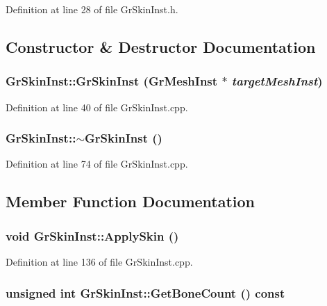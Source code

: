 Definition at line 28 of file GrSkinInst.h.

\subsection{Constructor \& Destructor Documentation}
\hypertarget{class_gr_skin_inst_97aaf25b3f26c18e5ad7032d74e57f40}{
\subsubsection[{GrSkinInst}]{\setlength{\rightskip}{0pt plus 5cm}GrSkinInst::GrSkinInst ({\bf GrMeshInst} $\ast$ {\em targetMeshInst})}}
\label{class_gr_skin_inst_97aaf25b3f26c18e5ad7032d74e57f40}




Definition at line 40 of file GrSkinInst.cpp.\hypertarget{class_gr_skin_inst_a74804ebf0e656cc67c4d4722eaf23ef}{
\subsubsection[{$\sim$GrSkinInst}]{\setlength{\rightskip}{0pt plus 5cm}GrSkinInst::$\sim$GrSkinInst ()}}
\label{class_gr_skin_inst_a74804ebf0e656cc67c4d4722eaf23ef}




Definition at line 74 of file GrSkinInst.cpp.

\subsection{Member Function Documentation}
\hypertarget{class_gr_skin_inst_26a87eb455330a647709378ca51f3d52}{
\subsubsection[{ApplySkin}]{\setlength{\rightskip}{0pt plus 5cm}void GrSkinInst::ApplySkin ()}}
\label{class_gr_skin_inst_26a87eb455330a647709378ca51f3d52}




Definition at line 136 of file GrSkinInst.cpp.\hypertarget{class_gr_skin_inst_cf78011014e52a7f8b14fe00a83b7151}{
\subsubsection[{GetBoneCount}]{\setlength{\rightskip}{0pt plus 5cm}unsigned int GrSkinInst::GetBoneCount () const}}
\label{class_gr_skin_inst_cf78011014e52a7f8b14fe00a83b7151}




